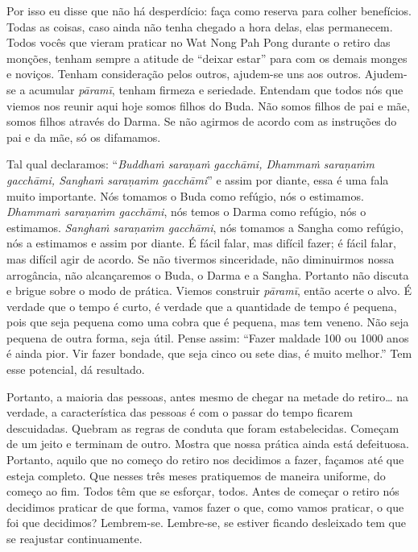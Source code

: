 Por isso eu disse que não há desperdício: faça como reserva para
colher benefícios. Todas as coisas, caso ainda não tenha chegado a hora
delas, elas permanecem. Todos vocês que vieram praticar no Wat Nong Pah
Pong durante o retiro das monções, tenham sempre a atitude de “deixar
estar” para com os demais monges e noviços. Tenham consideração pelos
outros, ajudem-se uns aos outros. Ajudem-se a acumular
\textit{pāramī}, tenham firmeza e seriedade. Entendam que todos
nós que viemos nos reunir aqui hoje somos filhos do Buda. Não somos
filhos de pai e mãe, somos filhos através do Darma. Se não agirmos de
acordo com as instruções do pai e da mãe, só os difamamos. 

Tal qual declaramos: “\textit{Buddhaṁ saraṇaṁ gacchāmi, Dhammaṁ
saraṇaṁm gacchāmi, Sanghaṁ saraṇaṁm gacchāmi}” e assim por diante,
essa é uma fala muito importante. Nós tomamos o Buda como refúgio, nós
o estimamos. \textit{Dhammaṁ saraṇaṁm gacchāmi}, nós temos o Darma
como refúgio, nós o estimamos. \textit{Sanghaṁ saraṇaṁm gacchāmi}, nós
tomamos a Sangha como refúgio, nós a estimamos e assim por diante. É
fácil falar, mas difícil fazer; é fácil falar, mas difícil agir de
acordo. Se não tivermos sinceridade, não diminuirmos nossa arrogância,
não alcançaremos o Buda, o Darma e a Sangha. Portanto não discuta e
brigue sobre o modo de prática. Viemos construir \textit{pāramī},
então acerte o alvo. É verdade que o tempo é curto, é verdade que a
quantidade de tempo é pequena, pois que seja pequena como uma cobra que
é pequena, mas tem veneno. Não seja pequena de outra forma, seja útil.
Pense assim: “Fazer maldade 100 ou 1000 anos é ainda pior. Vir fazer
bondade, que seja cinco ou sete dias, é muito melhor.” Tem esse
potencial, dá resultado. 

Portanto, a maioria das pessoas, antes mesmo de chegar na metade do
retiro… na verdade, a característica das pessoas é com o passar do
tempo ficarem descuidadas. Quebram as regras de conduta que foram
estabelecidas. Começam de um jeito e terminam de outro. Mostra que
nossa prática ainda está defeituosa. Portanto, aquilo que no começo do
retiro nos decidimos a fazer, façamos até que esteja completo. Que
nesses três meses pratiquemos de maneira uniforme, do começo ao fim.
Todos têm que se esforçar, todos. Antes de começar o retiro nós
decidimos praticar de que forma, vamos fazer o que, como vamos
praticar, o que foi que decidimos? Lembrem-se. Lembre-se, se estiver
ficando desleixado tem que se reajustar continuamente.

